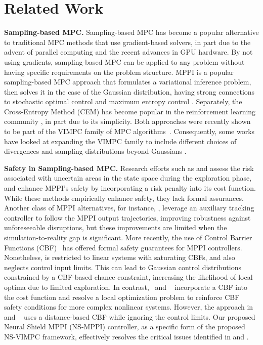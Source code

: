 \section{Related Work}
\noindent\textbf{Sampling-based MPC.} 
Sampling-based MPC has become a popular alternative to traditional MPC methods that use gradient-based solvers, in part due to the advent of parallel computing and the recent advances in GPU hardware.
By not using gradients, sampling-based MPC can be applied to any problem without having specific requirements on the problem structure.
MPPI \cite{InfoMPPI} is a popular sampling-based MPC approach that formulates a variational inference problem, then solves it in the case of the Gaussian distribution, having strong connections to stochastic optimal control \cite{TubeMPPI} and maximum entropy control \cite{so2022maximum}.
Separately, the Cross-Entropy Method (CEM) \cite{rubinstein1999cross} has become popular in the reinforcement learning community \cite{wang2021variational}, in part due to its simplicity.
Both approaches were recently shown to be part of the VIMPC family of MPC algorithms~\cite{okada2020variational}. 
Consequently, some works have looked at expanding the VIMPC family to include different choices of divergences \cite{wang2021variational} and sampling distributions beyond Gaussians \cite{lambert2020stein,okada2020variational}.

\beforetextbf{}

\noindent\textbf{Safety in Sampling-based MPC.}
Research efforts such as \cite{RAMPPI} and \cite{UncertaintyPushingMPPI} assess the risk associated with uncertain areas in the state space during the exploration phase, and enhance MPPI's safety by incorporating a risk penalty into its cost function. 
While these methods empirically enhance safety, they lack formal assurances. 
Another class of MPPI alternatives, for instance, \cite{TubeMPPI, L1Adaptive}, leverage an auxiliary tracking controller to follow the MPPI output trajectories, improving robustness against unforeseeable disruptions, but these improvements are limited when the simulation-to-reality gap is significant. 
More recently, the use of Control Barrier Functions (CBF)~\cite{MPPI-CBF,Shield-MPPI} has offered formal safety guarantees for MPPI controllers. 
Nonetheless, \cite{MPPI-CBF}  is restricted to linear systems with saturating CBFs, and also neglects control input limits. 
This can lead to Gaussian control distributions constrained by a CBF-based chance constraint, increasing the likelihood of local optima due to limited exploration. 
In contrast,~\cite{Shield-MPPI} and ~\cite{yin2024chance} incorporate a CBF into the cost function and resolve a local optimization problem to reinforce CBF safety conditions for more complex nonlinear systems. 
However, the approach in ~\cite{Shield-MPPI} and ~\cite{yin2024chance} uses a distance-based CBF while ignoring the control limits. Our proposed Neural Shield MPPI (NS-MPPI) controller, as a specific form of the proposed NS-VIMPC framework, effectively resolves the critical issues identified in \cite{MPPI-CBF} and \cite{Shield-MPPI}.

